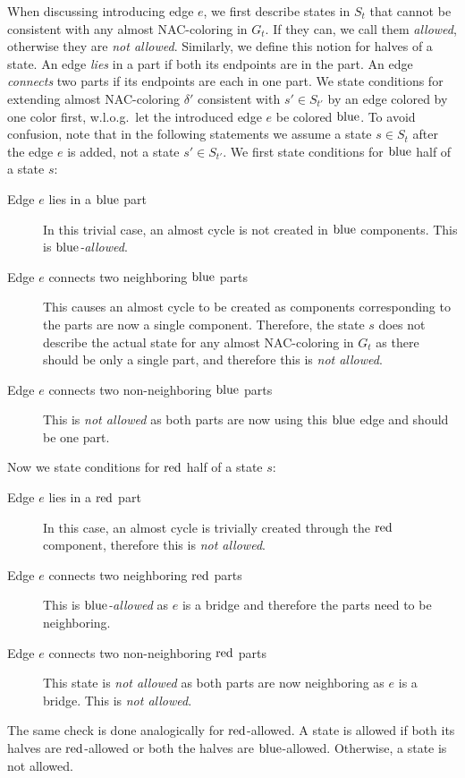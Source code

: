 When discussing \IntroduceEdgeNode{} introducing edge \( e \),
we first describe states in \( S_{t} \)
that cannot be consistent with any almost NAC-coloring in \( G_t \).
If they can, we call them \emph{allowed}, otherwise they are \emph{not allowed}.
Similarly, we define this notion for halves of a state.
%
An edge \emph{lies} in a part if both its endpoints are in the part.
An edge \emph{connects} two parts if its endpoints are each in one part.
%
We state conditions for extending almost NAC-coloring \( \delta' \)
consistent with \( s' \in S_{t'} \)
by an edge colored by one color first,
w.l.o.g.\ let the introduced edge \( e \) be colored \( \text{blue} \).
%
To avoid confusion, note that in the following statements we assume
a state \( s \in S_t \) after the edge \( e \) is added, not a state \( s' \in S_{t'} \).
%
We first state conditions for \( \text{blue} \) half of a state \( s \):
%
\begin{description}
	\item[Edge \( e \) lies in a \( \text{blue} \) part]
	      In this trivial case, an almost cycle is not created in \( \text{blue} \) components.
	      This is \emph{\( \text{blue} \)-allowed}.
	\item[Edge \( e \) connects two neighboring \( \text{blue} \) parts]
	      This causes an almost cycle to be created as
	      components corresponding to the parts
	      are now a single component.
	      Therefore, the state \( s \) does not describe
	      the actual state for any almost NAC-coloring in \( G_t \)
	      as there should be only a single part, and therefore this is \emph{not allowed}.
	\item[Edge \( e \) connects two non-neighboring \( \text{blue} \) parts]
	      This is \emph{not allowed} as both parts
	      are now using this \( \text{blue} \) edge and should be one part.
\end{description}
%
Now we state conditions for \( \text{red} \) half of a state \( s \):
%
\begin{description}
	\item[Edge \( e \) lies in a \( \text{red} \) part]
	      In this case, an almost cycle is trivially created
	      through the \( \text{red} \) component,
	      therefore this is \emph{not allowed}.
	\item[Edge \( e \) connects two neighboring \( \text{red} \) parts]
	      This is \emph{\( \text{blue} \)-allowed} as \( e \) is a bridge and
	      therefore the parts need to be neighboring.
	\item[Edge \( e \) connects two non-neighboring \( \text{red} \) parts]
	      This state is \emph{not allowed} as both parts
	      are now neighboring as \( e \) is a bridge.
	      This is \emph{not allowed}.
\end{description}
%
The same check is done analogically for \( \text{red} \)-allowed.
A state is allowed if both its halves are \( \text{red} \)-allowed or
both the halves are \( \text{blue} \)-allowed.
Otherwise, a state is not allowed.

